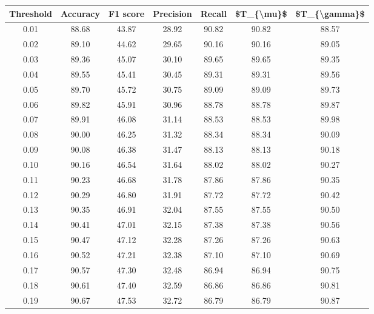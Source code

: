 \begin{tabular}{|c|c|c|c|c|c|c|}
\hline
 Threshold &  Accuracy &  F1 score &  Precision &  Recall &  \$T\_\{\textbackslash mu\}\$ &  \$T\_\{\textbackslash gamma\}\$ \\
\hline
      0.01 &     88.68 &     43.87 &      28.92 &   90.82 &      90.82 &         88.57 \\
      0.02 &     89.10 &     44.62 &      29.65 &   90.16 &      90.16 &         89.05 \\
      0.03 &     89.36 &     45.07 &      30.10 &   89.65 &      89.65 &         89.35 \\
      0.04 &     89.55 &     45.41 &      30.45 &   89.31 &      89.31 &         89.56 \\
      0.05 &     89.70 &     45.72 &      30.75 &   89.09 &      89.09 &         89.73 \\
      0.06 &     89.82 &     45.91 &      30.96 &   88.78 &      88.78 &         89.87 \\
      0.07 &     89.91 &     46.08 &      31.14 &   88.53 &      88.53 &         89.98 \\
      0.08 &     90.00 &     46.25 &      31.32 &   88.34 &      88.34 &         90.09 \\
      0.09 &     90.08 &     46.38 &      31.47 &   88.13 &      88.13 &         90.18 \\
      0.10 &     90.16 &     46.54 &      31.64 &   88.02 &      88.02 &         90.27 \\
      0.11 &     90.23 &     46.68 &      31.78 &   87.86 &      87.86 &         90.35 \\
      0.12 &     90.29 &     46.80 &      31.91 &   87.72 &      87.72 &         90.42 \\
      0.13 &     90.35 &     46.91 &      32.04 &   87.55 &      87.55 &         90.50 \\
      0.14 &     90.41 &     47.01 &      32.15 &   87.38 &      87.38 &         90.56 \\
      0.15 &     90.47 &     47.12 &      32.28 &   87.26 &      87.26 &         90.63 \\
      0.16 &     90.52 &     47.21 &      32.38 &   87.10 &      87.10 &         90.69 \\
      0.17 &     90.57 &     47.30 &      32.48 &   86.94 &      86.94 &         90.75 \\
      0.18 &     90.61 &     47.40 &      32.59 &   86.86 &      86.86 &         90.81 \\
      0.19 &     90.67 &     47.53 &      32.72 &   86.79 &      86.79 &         90.87 \\

\end{tabular}
